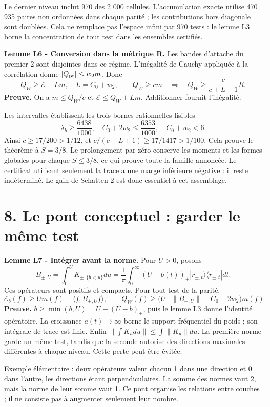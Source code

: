 \documentclass[
  10pt,
  a4paper,
]{article}
\begin{document}
Le dernier niveau inclut 970 des 2 000 cellules. L'accumulation exacte
utilise 470 935 paires non ordonnées dans chaque parité ; les
contributions hors diagonale sont doublées. Cela ne remplace pas
l'espace infini par 970 tests : le lemme L3 borne la concentration de
tout test dans les ensembles certifiés.

\textbf{Lemme L6 - Conversion dans la métrique R.} Les bandes d'attache
du premier 2 sont disjointes dans ce régime. L'inégalité de Cauchy
appliquée à la corrélation donne \(|Q_{\rm pr}|\le w_2m\). Donc \[
Q_W\ge\mathcal E-Lm,\quad L=C_0+w_2,
\qquad Q_W\ge cm
\quad\Longrightarrow\quad
Q_W\ge\frac{c}{c+L+1}R.
\] \textbf{Preuve.} On a \(m\le Q_W/c\) et \(\mathcal E\le Q_W+Lm\).
Additionner fournit l'inégalité.

Les intervalles établissent les trois bornes rationnelles lisibles \[
\lambda_b\ge\frac{6438}{1000},\quad
C_0+2w_2\le\frac{6353}{1000},\quad C_0+w_2<6.
\] Ainsi \(c\ge17/200>1/12\), et \(c/(c+L+1)\ge17/1417>1/100\). Cela
prouve le théorème à \(S=3/8\). Le prolongement par zéro conserve les
moments et les formes globales pour chaque \(S\le3/8\), ce qui prouve
toute la famille annoncée. Le certificat utilisant seulement la trace a
une marge inférieure négative : il reste indéterminé. Le gain de
Schatten-2 est donc essentiel à cet assemblage.

\hypertarget{le-pont-conceptuel-garder-le-muxeame-test}{%
\section{8. Le pont conceptuel : garder le même
test}\label{le-pont-conceptuel-garder-le-muxeame-test}}

\textbf{Lemme L7 - Intégrer avant la norme.} Pour \(U>0\), posons \[
B_{\pm,U}=\int_0^U K_{\pm,\{b<u\}}du
=\frac1\pi\int_0^\infty(U-b(t))_+
|r_{\pm,t}\rangle\langle r_{\pm,t}|dt.
\] Ces opérateurs sont positifs et compacts. Pour tout test de la
parité, \[
\mathcal E_b(f)\ge Um(f)-\langle f,B_{\pm,U}f\rangle,
\qquad Q_W(f)\ge
\bigl(U-\|B_{\pm,U}\|-C_0-2w_2\bigr)m(f).
\] \textbf{Preuve.} \(b\ge\min(b,U)=U-(U-b)_+\), puis le lemme L3 donne
l'identité opératoire. La croissance \(a(t)\to\infty\) borne le support
fréquentiel du poids ; son intégrale de trace est finie. Enfin
\(\|\int K_u du\|\le\int\|K_u\|du\). La première norme garde un même
test, tandis que la seconde autorise des directions maximales
différentes à chaque niveau. Cette perte peut être évitée.

Exemple élémentaire : deux opérateurs valent chacun 1 dans une direction
et 0 dans l'autre, les directions étant perpendiculaires. La somme des
normes vaut 2, mais la norme de leur somme vaut 1. Ce pont organise les
relations entre couches ; il ne consiste pas à augmenter seulement leur
nombre.
\end{document}
